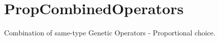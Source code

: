 \section{Prop\-Combined\-Operators}
\label{group___prop_combined_operators}
Combination of same-type Genetic Operators - Proportional choice.  
